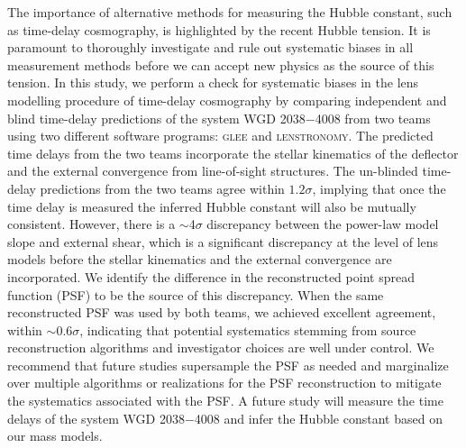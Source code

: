 \documentclass[longauth]{aa}
\newcommand{\ajs}[1]{{{#1}}}
\begin{document}
   \date{Received May XX, XXXX; accepted XX XX, XXXX}

 
  \abstract
  {The importance of alternative methods for measuring the Hubble constant, such as time-delay cosmography, is highlighted by the recent Hubble tension. It is paramount to thoroughly investigate and rule out systematic biases in all measurement methods before we can accept new physics as the source of this tension. In this study, we perform a check for systematic biases in the lens modelling procedure of time-delay cosmography by comparing independent and blind time-delay predictions of the system WGD 2038$-$4008 from two teams using two different software programs: \textsc{glee} and \textsc{lenstronomy}. The predicted time delays from the two teams incorporate the stellar kinematics of the deflector and the external convergence from line-of-sight structures. The un-blinded time-delay predictions from the two teams agree within $1.2\sigma$, implying that once the time delay is measured the inferred Hubble constant will also be mutually consistent. However, there is a $\sim$4$\sigma$ discrepancy between the power-law model slope and external shear, which is a significant discrepancy at the level of lens models before the stellar kinematics and the external convergence are incorporated. We identify the difference in the reconstructed point spread function (PSF) to be the source of this discrepancy. When the same reconstructed PSF was used by both teams, we achieved excellent agreement, within $\sim$0.6$\sigma$, indicating that potential systematics stemming from source reconstruction algorithms and investigator choices are well under control. We recommend that future studies supersample the PSF as needed and marginalize over multiple algorithms or realizations for the PSF reconstruction to mitigate the systematics associated with the PSF. A future study will measure the time delays of the system WGD 2038$-$4008 and infer the Hubble constant based on our mass models.
  }
\end{document}
